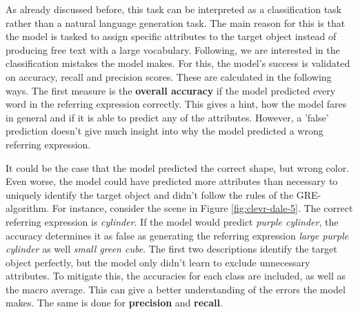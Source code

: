 As already discussed before, this task can be interpreted as a classification task rather than a natural language generation task.
The main reason for this is that the model is tasked to assign specific attributes to the target object instead of producing free text with a large vocabulary.
Following, we are interested in the classification mistakes the model makes.
For this, the model's success is validated on accuracy, recall and precision scores.
These are calculated in the following ways.
The first measure is the \textbf{overall accuracy} if the model predicted every word in the referring expression correctly.
This gives a hint, how the model fares in general and if it is able to predict any of the attributes.
However, a 'false' prediction doesn't give much insight into why the model predicted a wrong referring expression.

It could be the case that the model predicted the correct shape, but wrong color.
Even worse, the model could have predicted more attributes than necessary to uniquely identify the target object and didn't follow the rules of the GRE-algorithm.
For instance, consider the scene in Figure \ref{fig:clevr-dale-5}.
The correct referring expression is \emph{cylinder}.
If the model would predict \emph{purple cylinder}, the accuracy determines it as false as generating the referring expression \emph{large purple cylinder} as well \emph{small green cube}.
The first two descriptions identify the target object perfectly, but the model only didn't learn to exclude unnecessary attributes.
To mitigate this, the accuracies for each class are included, as well as the macro average.
This can give a better understanding of the errors the model makes.
The same is done for \textbf{precision} and \textbf{recall}.

